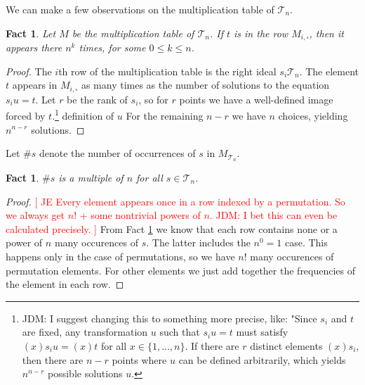 \documentclass{amsart}
\newcommand{\cT}{{\mathcal T}}
\newcommand{\todo}[1]{\textcolor{red}{ \small \textsf{[ #1 ]} \normalsize}}
\theoremstyle{plain}
\newtheorem{fact}[theorem]{Fact}
\theoremstyle{definition}
\begin{document}
We can make a few observations on the multiplication table of $\cT_n$.
\begin{fact}
\label{fact:npower}
Let $M$ be the multiplication table of $\cT_n$.
If $t$ is in the row $M_{i,\square}$, then it appears there $n^k$ times, for some $0\leq k\leq n$.
\end{fact}
\begin{proof}
The $i$th row of the multiplication table is the right  ideal $s_i\cT_n$.
The element $t$ appears in $M_{i,\square}$ as many times as the number of solutions to the equation $s_iu=t$.
Let $r$ be the rank of $s_i$, so for $r$ points we have a well-defined image
forced by $t$.\footnote{JDM: I suggest changing this to something more precise,
  like: "Since $s_i$ and $t$ are fixed, any transformation $u$ such that
  $s_iu=t$ must satisfy $(x)s_iu=(x)t$ for all $x\in \{1,\ldots, n\}$. If there
  are $r$ distinct elements $(x)s_i$, then there are $n-r$ points where $u$ can
be defined arbitrarily, which yields $n^{n-r}$ possible solutions $u$.}
  definition of $u$ 
For the remaining $n-r$ we have $n$ choices, yielding $n^{n-r}$ solutions. 
\end{proof}
Let $\#s$ denote the number of occurrences of $s$ in $M_{\cT_n}$.
\begin{fact}
$\#s$ is a multiple of $n$ for all $s\in\cT_n$.
\end{fact}
\begin{proof}
\todo{JE Every element appears once in a row indexed by a permutation. So we
always get $n!$ + some nontrivial powers of $n$. JDM: I bet this can even be
calculated precisely.}
From Fact \ref{fact:npower} we know that each row contains none or a power of $n$ many occurences of $s$.
The latter includes the $n^0=1$ case.
This happens only in the case of permutations, so we have $n!$ many occurences of permutation elements.
For other elements we just add together the frequencies of the element in each row.
\end{proof}
\end{document}
